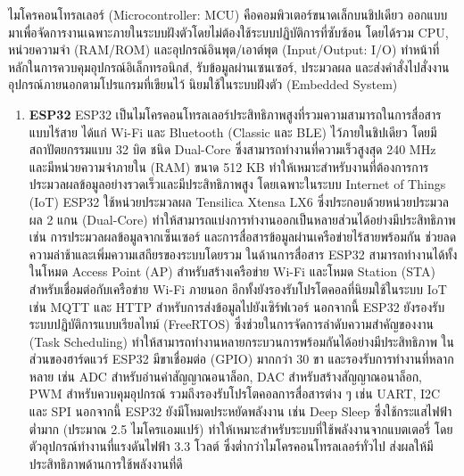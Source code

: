 ไมโครคอนโทรลเลอร์ (Microcontroller: MCU) คือคอมพิวเตอร์ขนาดเล็กบนชิปเดียว ออกแบบมาเพื่อจัดการงานเฉพาะภายในระบบฝังตัวโดยไม่ต้องใช้ระบบปฏิบัติการที่ซับซ้อน
โดยได้รวม CPU, หน่วยความจำ (RAM/ROM) และอุปกรณ์อินพุต/เอาต์พุต (Input/Output: I/O) ทำหน้าที่หลักในการควบคุมอุปกรณ์อิเล็กทรอนิกส์, รับข้อมูลผ่านเซนเซอร์, ประมวลผล และส่งคำสั่งไปสั่งงานอุปกรณ์ภายนอกตามโปรแกรมที่เขียนไว้ นิยมใช้ในระบบฝังตัว (Embedded System)\cite{ibm_mcu} 
\begin{enumerate}
\item \textbf{ESP32}
ESP32 เป็นไมโครคอนโทรลเลอร์ประสิทธิภาพสูงที่รวมความสามารถในการสื่อสารแบบไร้สาย ได้แก่ Wi-Fi และ Bluetooth (Classic และ BLE) ไว้ภายในชิปเดียว โดยมีสถาปัตยกรรมแบบ 32 บิต ชนิด Dual-Core ซึ่งสามารถทำงานที่ความเร็วสูงสุด 240 MHz และมีหน่วยความจำภายใน (RAM) ขนาด 512 KB ทำให้เหมาะสำหรับงานที่ต้องการการประมวลผลข้อมูลอย่างรวดเร็วและมีประสิทธิภาพสูง โดยเฉพาะในระบบ Internet of Things (IoT)
ESP32 ใช้หน่วยประมวลผล Tensilica Xtensa LX6 ซึ่งประกอบด้วยหน่วยประมวลผล 2 แกน (Dual-Core) ทำให้สามารถแบ่งการทำงานออกเป็นหลายส่วนได้อย่างมีประสิทธิภาพ เช่น การประมวลผลข้อมูลจากเซ็นเซอร์ และการสื่อสารข้อมูลผ่านเครือข่ายไร้สายพร้อมกัน ช่วยลดความล่าช้าและเพิ่มความเสถียรของระบบโดยรวม
ในด้านการสื่อสาร ESP32 สามารถทำงานได้ทั้งในโหมด Access Point (AP) สำหรับสร้างเครือข่าย Wi-Fi และโหมด Station (STA) สำหรับเชื่อมต่อกับเครือข่าย Wi-Fi ภายนอก อีกทั้งยังรองรับโปรโตคอลที่นิยมใช้ในระบบ IoT เช่น MQTT และ HTTP สำหรับการส่งข้อมูลไปยังเซิร์ฟเวอร์ นอกจากนี้ ESP32 ยังรองรับระบบปฏิบัติการแบบเรียลไทม์ (FreeRTOS) ซึ่งช่วยในการจัดการลำดับความสำคัญของงาน (Task Scheduling) ทำให้สามารถทำงานหลายกระบวนการพร้อมกันได้อย่างมีประสิทธิภาพ
ในส่วนของฮาร์ดแวร์ ESP32 มีขาเชื่อมต่อ (GPIO) มากกว่า 30 ขา และรองรับการทำงานที่หลากหลาย เช่น ADC สำหรับอ่านค่าสัญญาณอนาล็อก, DAC สำหรับสร้างสัญญาณอนาล็อก, PWM สำหรับควบคุมอุปกรณ์ รวมถึงรองรับโปรโตคอลการสื่อสารต่าง ๆ เช่น UART, I2C และ SPI นอกจากนี้ ESP32 ยังมีโหมดประหยัดพลังงาน เช่น Deep Sleep ซึ่งใช้กระแสไฟฟ้าต่ำมาก (ประมาณ 2.5 ไมโครแอมแปร์) ทำให้เหมาะสำหรับระบบที่ใช้พลังงานจากแบตเตอรี่ โดยตัวอุปกรณ์ทำงานที่แรงดันไฟฟ้า 3.3 โวลต์ ซึ่งต่ำกว่าไมโครคอนโทรลเลอร์ทั่วไป ส่งผลให้มีประสิทธิภาพด้านการใช้พลังงานที่ดี \cite{devadiy_esp32}
\end{enumerate}


